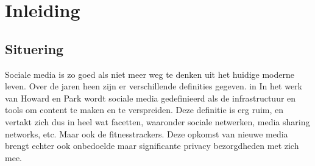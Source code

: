 
\chapter{Inleiding}

\section{Situering}
Sociale media is zo goed als niet meer weg te denken uit het huidige moderne
leven. Over de jaren heen zijn er verschillende definities gegeven. in In het
werk van Howard en Park wordt sociale media gedefinieerd als de infrastructuur
en tools om content te maken en te verspreiden\cite{PhilipsAndParks}. Deze
definitie is erg ruim, en vertakt zich dus in heel wat facetten, waaronder
sociale netwerken, media sharing networks, etc. Maar ook de fitnesstrackers.
Deze opkomst van nieuwe media brengt echter ook onbedoelde maar significante
privacy bezorgdheden met zich mee.

